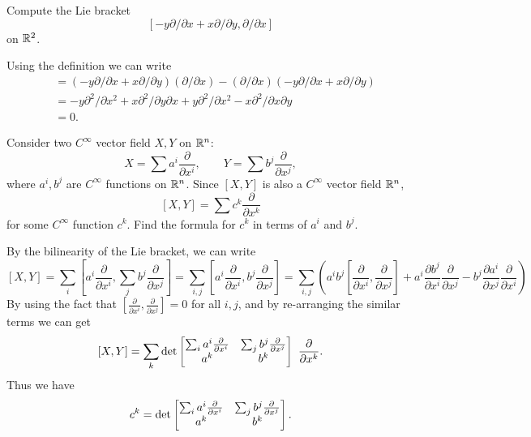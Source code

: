 \begin{problem}
	Compute the Lie bracket 
	\[ [-y\partial/\partial x + x\partial/\partial y, \partial/\partial x] \]
	on $ \mathbb{R}^2 $.
\end{problem}
\begin{solution}
	Using the definition we can write
	\begin{align*}
		[-y\partial/\partial x + x\partial/\partial y, \partial/\partial x] &= (-y\partial/\partial x + x\partial/\partial y)( \partial/\partial x) -( \partial/\partial x)(-y\partial/\partial x + x\partial/\partial y) \\
		&= -y \partial^2/\partial x^2 + x \partial^2/\partial y\partial x + y\partial^2/\partial x^2 - x\partial^2/\partial x \partial y \\
		& = 0.
	\end{align*}
\end{solution}

\begin{problem}
	Consider two $ C^\infty $ vector field $ X, Y $ on $ \mathbb{R}^n $:
	\[ X = \sum a^i \frac{\partial}{\partial x^i},\qquad Y = \sum b^j \frac{\partial}{\partial x^j}, \]
	where $ a^i, b^j$ are $ C^\infty $ functions on $ \mathbb{R}^n $. Since $ [X,Y] $ is also a $ C^\infty $ vector field $ \mathbb{R}^n $,
	\[ [X,Y] = \sum c^k \frac{\partial }{\partial x^k} \]
	for some $ C^\infty $ function $ c^k $. Find the formula for $ c^k $ in terms of $ a^i $ and $ b^j $.
\end{problem}
\begin{solution}
	By the bilinearity of the Lie bracket, we can write
	\[ [X,Y] = \sum_i [a^i \frac{\partial}{\partial x^i}, \sum_j b^j \frac{\partial}{\partial x^j}] 
	= \sum_{i,j}[a^i \frac{\partial }{\partial x^i}, b^j\frac{\partial }{\partial x^j}]
	= \sum_{i,j}( a^i b^j [\frac{\partial }{\partial x^i},\frac{\partial }{\partial x^j}] + a^i \frac{\partial b^j}{\partial x^i}\frac{\partial }{\partial x^j} - b^j \frac{\partial a^i}{\partial x^j}\frac{\partial }{\partial x^i})
	 \]
	By using the fact that $ [\frac{\partial }{\partial x^i},\frac{\partial}{\partial x^j}] = 0 $ for all $ i,j $, and by re-arranging the similar terms we can get
	\[ [X,Y] = \sum_k 
	\det \begin{bmatrix} \sum_i a^i \frac{\partial }{\partial x^i} & \sum_j b^j \frac{\partial}{\partial x^j} \\ a^k & b^k \end{bmatrix}\ \frac{\partial }{\partial x^k}.\]
	Thus we have
	\[ c^k = \det \begin{bmatrix} \sum_i a^i \frac{\partial }{\partial x^i} & \sum_j b^j \frac{\partial}{\partial x^j} \\ a^k & b^k \end{bmatrix}. \]
\end{solution}